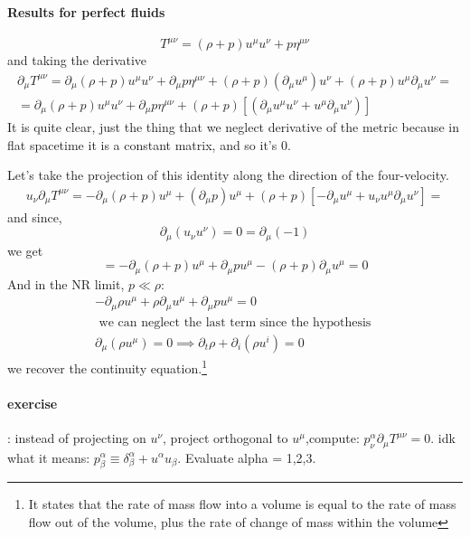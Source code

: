 \paragraph{Results for perfect fluids}
\[
T^{\mu \nu } = \left( \rho  +p \right) u^{\mu }u^{\nu }+p \eta^{\mu \nu }
\]
and taking the derivative
\begin{gather*}
\partial_{\mu } T^{\mu \nu } = \partial_{\mu }\left( \rho +p \right)u^{\mu }u^{\nu } + \partial_{\mu }p \eta^{\mu \nu } + \left( \rho +p \right)\left( \partial_{\mu }u^{\mu } \right)u^{\nu } + \left( \rho +p \right) u^{\mu }\partial_{\mu }u^{\nu } = \\
= \partial_{\mu }\left( \rho +p \right)u^{\mu }u^{\nu }+ \partial_{\mu }p \eta^{\mu \nu } + \left( \rho +p \right) [\left( \partial_{\mu }u^{\mu }u^{\nu } + u^{\mu }\partial_{\mu }u^{\nu } \right)]
\end{gather*}
It is quite clear, just the thing that we neglect derivative of the metric because in flat spacetime it is a constant matrix, and so it's 0.\par
Let's take the projection of this identity along the direction of the four-velocity.
\begin{gather*}
	u_{\nu }\partial_{\mu }T^{\mu \nu } = -\partial_{\mu }\left( \rho +p \right)u^{\mu }+\left( \partial_{\mu }p \right)u^{\mu }+\left( \rho +p \right)[-\partial_{\mu }u^{\mu }+u_{\nu }u^{\mu }\partial_{\mu }u^{\nu }] =
\end{gather*}
and since, 
\[
\partial_{\mu }\left( u_{\nu }u^{\nu } \right) = 0 = \partial_{\mu }\left( -1 \right)
\]
we get
\begin{equation}
= -\partial_{\mu }\left( \rho +p \right)u^{\mu } + \partial_{\mu }p u^{\mu }- \left( \rho +p \right)\partial_{\mu }u^{\mu } = 0
\end{equation}
And in the NR limit, $p\ll \rho $:
\begin{gather*}
-\partial_{\mu }\rho  u^{\mu }+\rho \partial_{\mu }u^{\mu }+ \partial_{\mu }pu^{\mu }=0 \\
\text{ we can neglect the last term since the hypothesis } \\
\partial_{\mu }\left( \rho u^{\mu } \right) = 0 \implies \partial_{t}\rho +\partial_{i}\left( \rho u^{i} \right) = 0
\end{gather*}
we recover the continuity equation.\footnote{It states that the rate of mass flow into a volume is equal to the rate of mass flow out of the volume, plus the rate of change of mass within the volume}

\paragraph{exercise}: instead of projecting on $u^{\nu  }$, project orthogonal to $u^{\mu }$,compute: $p^{\alpha }_{\nu } \partial_{\mu }T^{\mu \nu }=0$.
idk what it means: $p^{\alpha }_{\beta }\equiv \delta^{\alpha }_{\beta } + u^{\alpha }u_{\beta }$. Evaluate alpha = 1,2,3.





